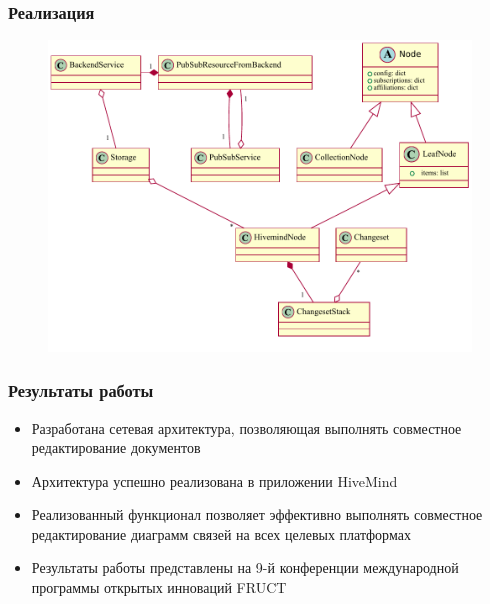 \documentclass[unicode]{beamer}
\begin{document}
\begin{frame}
\transwipe[direction=90]
\frametitle{Реализация}
\begin{figure}[h!] 
\centering
\includegraphics[scale=0.65]{idavoll-classes} 
\end{figure}
\end{frame}

\begin{frame}
\transwipe[direction=90]
\frametitle{Результаты работы}
\begin{itemize}
  \item Разработана сетевая архитектура, позволяющая выполнять совместное
  редактирование документов
  \item Архитектура успешно реализована в приложении HiveMind
  \item Реализованный функционал позволяет эффективно выполнять совместное
  редактирование диаграмм связей на всех целевых платформах
  \item Результаты работы представлены на 9-й конференции международной
  программы открытых инноваций FRUCT
\end{itemize}
\end{frame}
\end{document}
